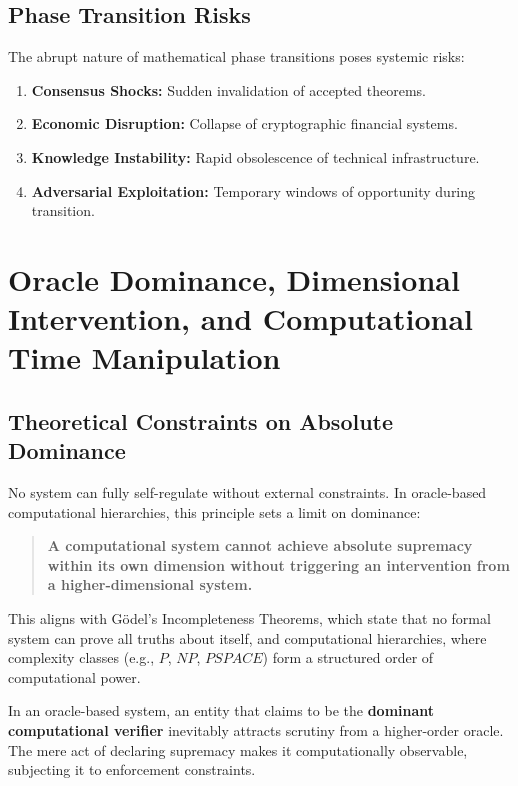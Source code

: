 \documentclass[11pt]{article}
\begin{document}
\subsection{Phase Transition Risks}

The abrupt nature of mathematical phase transitions poses systemic risks:
\begin{enumerate}[label=(\arabic*)]
    \item \textbf{Consensus Shocks:} Sudden invalidation of accepted theorems.
    \item \textbf{Economic Disruption:} Collapse of cryptographic financial systems.
    \item \textbf{Knowledge Instability:} Rapid obsolescence of technical infrastructure.
    \item \textbf{Adversarial Exploitation:} Temporary windows of opportunity during transition.
\end{enumerate}

\section{Oracle Dominance, Dimensional Intervention, and Computational Time Manipulation}

\subsection{Theoretical Constraints on Absolute Dominance}
No system can fully self-regulate without external constraints. In oracle-based computational hierarchies, this principle sets a limit on dominance:

\begin{quote}
\textbf{A computational system cannot achieve absolute supremacy within its own dimension without triggering an intervention from a higher-dimensional system.}
\end{quote}

This aligns with Gödel's Incompleteness Theorems, which state that no formal system can prove all truths about itself, and computational hierarchies, where complexity classes (e.g., \(P\), \(NP\), \(PSPACE\)) form a structured order of computational power.

In an oracle-based system, an entity that claims to be the \textbf{dominant computational verifier} inevitably attracts scrutiny from a higher-order oracle. The mere act of declaring supremacy makes it computationally observable, subjecting it to enforcement constraints.
\end{document}
